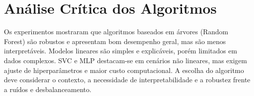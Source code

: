 \section{Análise Crítica dos Algoritmos}
Os experimentos mostraram que algoritmos baseados em árvores (Random Forest) são robustos e apresentam bom desempenho geral, mas são menos interpretáveis. Modelos lineares são simples e explicáveis, porém limitados em dados complexos. SVC e MLP destacam-se em cenários não lineares, mas exigem ajuste de hiperparâmetros e maior custo computacional. A escolha do algoritmo deve considerar o contexto, a necessidade de interpretabilidade e a robustez frente a ruídos e desbalanceamento.
